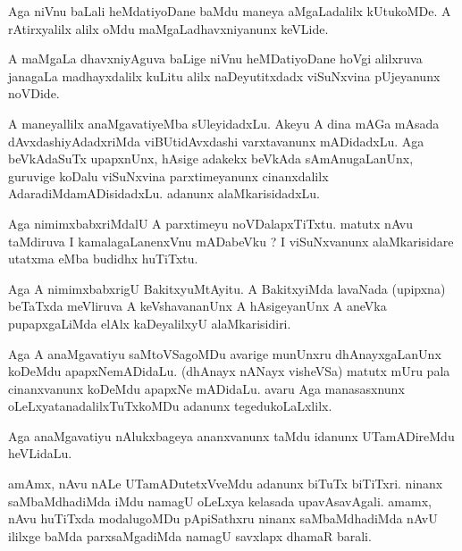\documentclass{article}
\begin{document}
\begin{mn}
Aga  niVnu  baLali  heMdatiyoDane  baMdu  maneya  aMgaLadalilx  kUtukoMDe.  A  
rAtirxyalilx  alilx  oMdu  maMgaLadhavxniyanunx  keVLide.
\end{mn}

\begin{mn}
A  maMgaLa dhavxniyAguva  baLige  niVnu  heMDatiyoDane  hoVgi  alilxruva  janagaLa  
madhayxdalilx  kuLitu  alilx  naDeyutitxdadx  viSuNxvina  pUjeyanunx  noVDide.
\end{mn}

\begin{mn}
A  maneyallilx  anaMgavatiyeMba  sUleyidadxLu.  Akeyu  A dina  mAGa  mAsada  
dAvxdashiyAdadxriMda  viBUtidAvxdashi  varxtavanunx  mADidadxLu.  Aga  beVkAdaSuTx  
upapxnUnx,  hAsige  adakekx  beVkAda  sAmAnugaLanUnx,  guruvige  koDalu  viSuNxvina  
parxtimeyanunx  cinanxdalilx  AdaradiMdamADisidadxLu.  adanunx  alaMkarisidadxLu.
\end{mn}

\begin{mn}
Aga  nimimxbabxriMdalU  A  parxtimeyu  noVDalapxTiTxtu.  matutx  nAvu  taMdiruva  I  
kamalagaLanenxVnu  mADabeVku ?  I  viSuNxvanunx  alaMkarisidare  utatxma  eMba  budidhx  huTiTxtu.
\end{mn}

\begin{mn}
Aga  A  nimimxbabxrigU  BakitxyuMtAyitu.  A  BakitxyiMda  lavaNada (upipxna) beTaTxda  meVliruva  A  
keVshavananUnx    A  hAsigeyanUnx  A  aneVka  pupapxgaLiMda  elAlx  kaDeyalilxyU  alaMkarisidiri.
\end{mn}

\begin{mn}
Aga  A  anaMgavatiyu  saMtoVSagoMDu  avarige  munUnxru  dhAnayxgaLanUnx  koDeMdu  apapxNemADidaLu.  
(dhAnayx  nANayx visheVSa)  matutx  mUru  pala  cinanxvanunx  koDeMdu  apapxNe mADidaLu.  avaru  
Aga  manasasxnunx  oLeLxyatanadalilxTuTxkoMDu  adanunx  tegedukoLaLxlilx.
\end{mn}

\begin{mn}
Aga  anaMgavatiyu  nAlukxbageya  ananxvanunx  taMdu  idanunx  UTamADireMdu  heVLidaLu.
\end{mn}

\begin{mn}
amAmx,  nAvu  nALe  UTamADutetxVveMdu  adanunx  biTuTx biTiTxri.  ninanx  
saMbaMdhadiMda  iMdu  namagU  oLeLxya  kelasada  upavAsavAgali.  amamx,  nAvu  
huTiTxda  modalugoMDu  pApiSathxru  ninanx  saMbaMdhadiMda  nAvU  ililxge  
baMda  parxsaMgadiMda  namagU  savxlapx  dhamaR  barali.
\end{mn}
\end{document}
